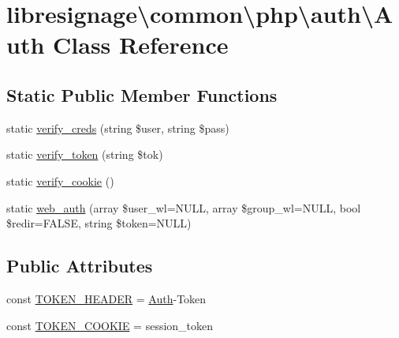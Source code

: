 \hypertarget{classlibresignage_1_1common_1_1php_1_1auth_1_1Auth}{}\section{libresignage\textbackslash{}common\textbackslash{}php\textbackslash{}auth\textbackslash{}Auth Class Reference}
\label{classlibresignage_1_1common_1_1php_1_1auth_1_1Auth}
\subsection*{Static Public Member Functions}
\begin{DoxyCompactItemize}
\item 
static \hyperlink{classlibresignage_1_1common_1_1php_1_1auth_1_1Auth_a398fad430d9d4c1a4dad69461fa36616}{verify\+\_\+creds} (string \$user, string \$pass)
\item 
static \hyperlink{classlibresignage_1_1common_1_1php_1_1auth_1_1Auth_a6557d3a404668af8036f3055369ca168}{verify\+\_\+token} (string \$tok)
\item 
static \hyperlink{classlibresignage_1_1common_1_1php_1_1auth_1_1Auth_aef510d03645d2c2bc43b516f66806717}{verify\+\_\+cookie} ()
\item 
static \hyperlink{classlibresignage_1_1common_1_1php_1_1auth_1_1Auth_a6e841f3f246174d63e6b7caa14273726}{web\+\_\+auth} (array \$user\+\_\+wl=N\+U\+LL, array \$group\+\_\+wl=N\+U\+LL, bool \$redir=F\+A\+L\+SE, string \$token=N\+U\+LL)
\end{DoxyCompactItemize}
\subsection*{Public Attributes}
\begin{DoxyCompactItemize}
\item 
const \hyperlink{classlibresignage_1_1common_1_1php_1_1auth_1_1Auth_af2912ac55975aa9795023c917bcd5e62}{T\+O\+K\+E\+N\+\_\+\+H\+E\+A\+D\+ER} = \textquotesingle{}\hyperlink{classlibresignage_1_1common_1_1php_1_1auth_1_1Auth}{Auth}-\/Token\textquotesingle{}
\item 
const \hyperlink{classlibresignage_1_1common_1_1php_1_1auth_1_1Auth_a9754d3a2963e6400671d1393a190b98f}{T\+O\+K\+E\+N\+\_\+\+C\+O\+O\+K\+IE} = \textquotesingle{}session\+\_\+token\textquotesingle{}
\end{DoxyCompactItemize}


